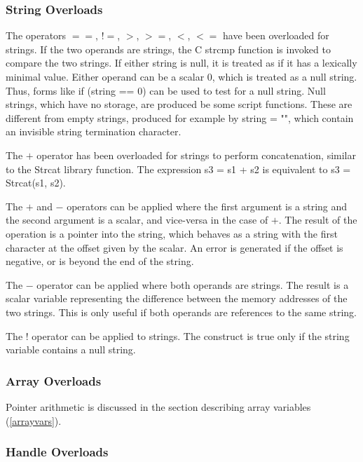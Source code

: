 \subsubsection{String Overloads}

The operators $==$, $!=$, $>$, $>=$, $<$, $<=$ have been overloaded
for strings.  If the two operands are strings, the C {\vt strcmp}
function is invoked to compare the two strings.  If either string is
null, it is treated as if it has a lexically minimal value.  Either
operand can be a scalar 0, which is treated as a null string.  Thus,
forms like {\vt if (string == 0)} can be used to test for a null
string.  Null strings, which have no storage, are produced be some
script functions.  These are different from empty strings, produced
for example by {\vt string = ""}, which contain an invisible string
termination character.

The $+$ operator has been overloaded for strings to perform
concatenation, similar to the {\vt Strcat} library function.  The
expression {\vt s3 = s1 + s2} is equivalent to {\vt s3 = Strcat(s1,
s2)}.

The $+$ and $-$ operators can be applied where the first argument is a
string and the second argument is a scalar, and vice-versa in the case
of $+$.  The result of the operation is a pointer into the string,
which behaves as a string with the first character at the offset given
by the scalar.  An error is generated if the offset is negative, or is
beyond the end of the string.

The $-$ operator can be applied where both operands are strings.  The
result is a scalar variable representing the difference between the
memory addresses of the two strings.  This is only useful if both
operands are references to the same string.

The {\vt !} operator can be applied to strings.  The construct is
true only if the string variable contains a null string.

\subsubsection{Array Overloads}

Pointer arithmetic is discussed in the section describing
array variables (\ref{arrayvars}).

\subsubsection{Handle Overloads}

